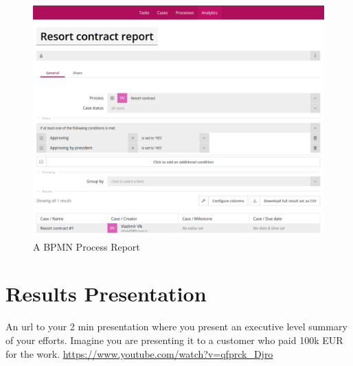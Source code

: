 \begin{figure}[h]\centering
	\includegraphics[width=\textwidth]{pic/BPMNReport}
	\caption{A BPMN Process Report~\cite{kutisvlk2019}}
	\label{fig:bpmnReport}
\end{figure}

\section{Results Presentation}\label{sec:presentation}

An url to your 2 min presentation where you present an executive level summary of your efforts. Imagine you are presenting it to a customer who paid 100k EUR for the work. \url{https://www.youtube.com/watch?v=qfprck_Djro} 
